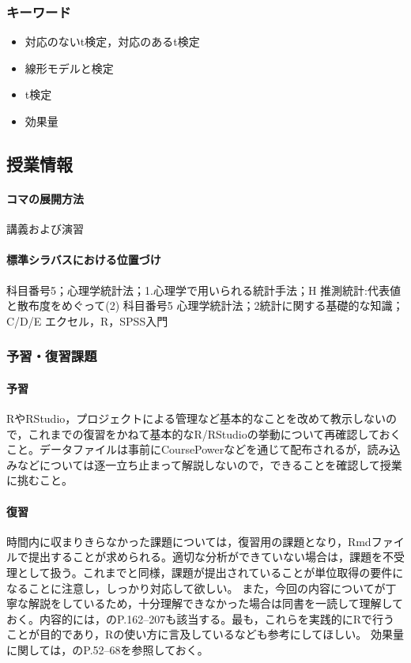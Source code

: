 \subsubsection{キーワード}
\begin{itemize}
	\item 対応のないt検定，対応のあるt検定
	\item 線形モデルと検定
	\item t検定
	\item 効果量
\end{itemize}
\subsection{授業情報}
\paragraph{コマの展開方法}
講義および演習
\paragraph{標準シラバスにおける位置づけ}
科目番号5；心理学統計法；1.心理学で用いられる統計手法；H 推測統計:代表値と散布度をめぐって(2)
科目番号5 心理学統計法；2統計に関する基礎的な知識；C/D/E エクセル，R，SPSS入門
\subsubsection{予習・復習課題}
\paragraph{予習}
RやRStudio，プロジェクトによる管理など基本的なことを改めて教示しないので，これまでの復習をかねて基本的なR/RStudioの挙動について再確認しておくこと。データファイルは事前にCoursePowerなどを通じて配布されるが，読み込みなどについては逐一立ち止まって解説しないので，できることを確認して授業に挑むこと。
\paragraph{復習}
時間内に収まりきらなかった課題については，復習用の課題となり，Rmdファイルで提出することが求められる。適切な分析ができていない場合は，課題を不受理として扱う。これまでと同様，課題が提出されていることが単位取得の要件になることに注意し，しっかり対応して欲しい。
また，今回の内容について\textcite{Hashimoto201607}が丁寧な解説をしているため，十分理解できなかった場合は同書を一読して理解しておく。内容的には，\textcite{Yamada2004}のP.162--207も該当する。最も，これらを実践的にRで行うことが目的であり，Rの使い方に言及している\textcite{kosugi2019}なども参考にしてほしい。
効果量に関しては，\textcite{Matia201201}のP.52--68を参照しておく。
